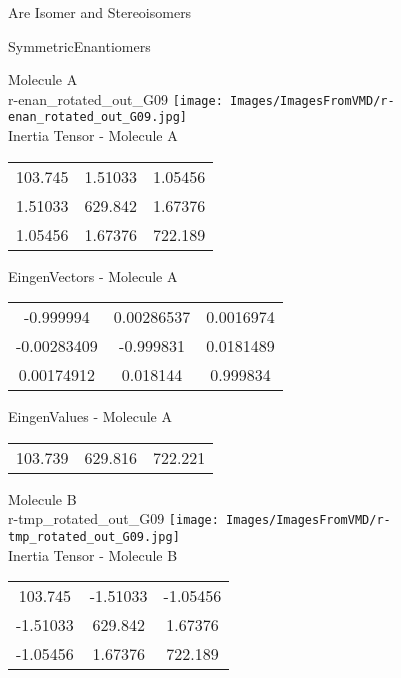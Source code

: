 \begin{center}
\vtab
\vtab
\textcolor{NavyBlue}{\Large Are Isomer and Stereoisomers}
\end{center}
\newpage

\vtab[-2cm]
\begin{center}
{\large SymmetricEnantiomers}
\end{center}
\begin{multicols}{2}
\begin{center}
Molecule A \\ 
r-enan\_rotated\_out\_G09
\texttt{[image: Images/ImagesFromVMD/r-enan\_rotated\_out\_G09.jpg]}
\\
Inertia Tensor - Molecule A \\
\vtab
\begin{tabular}{|c c c|}
103.745	 & 	1.51033	 & 	1.05456	 \\
1.51033	 & 	629.842	 & 	1.67376	 \\
1.05456	 & 	1.67376	 & 	722.189
\end{tabular}

\vtab
 EingenVectors - Molecule A     \\
\vtab
\begin{tabular}{|c c c|}
-0.999994	 & 	0.00286537	 & 	0.0016974	 \\
-0.00283409	 & 	-0.999831	 & 	0.0181489	 \\
0.00174912	 & 	0.018144	 & 	0.999834
\end{tabular}

\vtab
 EingenValues - Molecule A     \\
\vtab
\begin{tabular}{|c c c|}
103.739	 & 	629.816	 & 	722.221
\end{tabular}
\columnbreak

Molecule B \\ 
r-tmp\_rotated\_out\_G09
\texttt{[image: Images/ImagesFromVMD/r-tmp\_rotated\_out\_G09.jpg]}
\\
Inertia Tensor - Molecule B \\
\vtab
\begin{tabular}{|c c c|}
103.745	 & 	-1.51033	 & 	-1.05456	 \\
-1.51033	 & 	629.842	 & 	1.67376	 \\
-1.05456	 & 	1.67376	 & 	722.189
\end{tabular}


\end{center}
\end{multicols}
